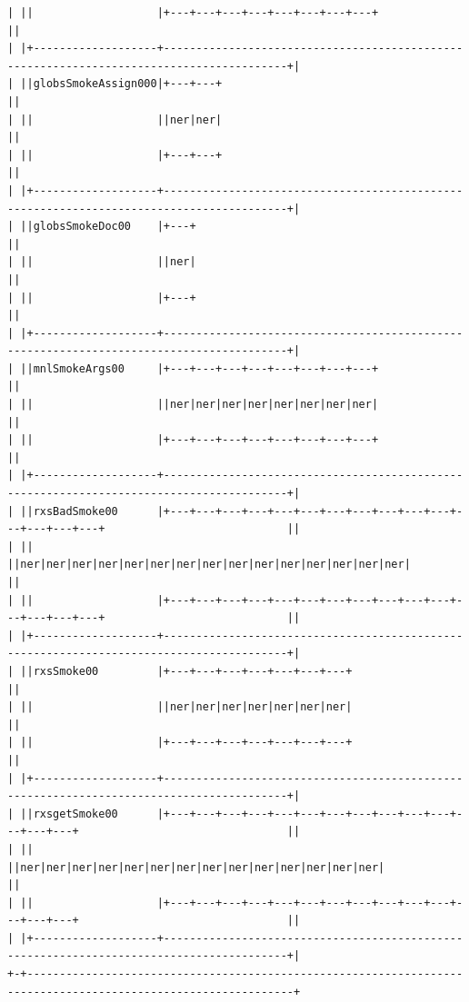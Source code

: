 \documentclass[11pt,letter,landscape]{article}
\begin{document}
\begin{Verbatim}[commandchars=\\\{\}]
| ||                   |+---+---+---+---+---+---+---+---+                                                        ||
| |+-------------------+-----------------------------------------------------------------------------------------+|
| ||globsSmokeAssign000|+---+---+                                                                                ||
| ||                   ||ner|ner|                                                                                ||
| ||                   |+---+---+                                                                                ||
| |+-------------------+-----------------------------------------------------------------------------------------+|
| ||globsSmokeDoc00    |+---+                                                                                    ||
| ||                   ||ner|                                                                                    ||
| ||                   |+---+                                                                                    ||
| |+-------------------+-----------------------------------------------------------------------------------------+|
| ||mnlSmokeArgs00     |+---+---+---+---+---+---+---+---+                                                        ||
| ||                   ||ner|ner|ner|ner|ner|ner|ner|ner|                                                        ||
| ||                   |+---+---+---+---+---+---+---+---+                                                        ||
| |+-------------------+-----------------------------------------------------------------------------------------+|
| ||rxsBadSmoke00      |+---+---+---+---+---+---+---+---+---+---+---+---+---+---+---+                            ||
| ||                   ||ner|ner|ner|ner|ner|ner|ner|ner|ner|ner|ner|ner|ner|ner|ner|                            ||
| ||                   |+---+---+---+---+---+---+---+---+---+---+---+---+---+---+---+                            ||
| |+-------------------+-----------------------------------------------------------------------------------------+|
| ||rxsSmoke00         |+---+---+---+---+---+---+---+                                                            ||
| ||                   ||ner|ner|ner|ner|ner|ner|ner|                                                            ||
| ||                   |+---+---+---+---+---+---+---+                                                            ||
| |+-------------------+-----------------------------------------------------------------------------------------+|
| ||rxsgetSmoke00      |+---+---+---+---+---+---+---+---+---+---+---+---+---+---+                                ||
| ||                   ||ner|ner|ner|ner|ner|ner|ner|ner|ner|ner|ner|ner|ner|ner|                                ||
| ||                   |+---+---+---+---+---+---+---+---+---+---+---+---+---+---+                                ||
| |+-------------------+-----------------------------------------------------------------------------------------+|
+-+---------------------------------------------------------------------------------------------------------------+

    \end{Verbatim}
\end{document}
